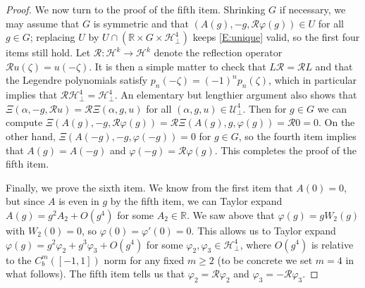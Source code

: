 \documentclass[11pt,reqno]{amsart}
\numberwithin{equation}{section}
\def\h{\mathcal{H}}
\def\R{\mathbb{R}}
\begin{document}
\begin{proof}
We now turn to the proof of the fifth item. Shrinking $G$ if necessary, we may assume that $G$ is symmetric and that $(A(g),-g,\mathcal{R}\varphi(g)) \in U$ for all $g \in G$; replacing $U$ by $U \cap (\R \times G \times \h^4_\bot)$ keeps \eqref{E:unique} valid, so the first four items still hold.  Let $\mathcal{R} : \h^k \to \h^k$ denote the reflection operator $\mathcal{R}u(\zeta) = u(-\zeta)$.  It is then a simple matter to check that $L \mathcal{R} = \mathcal{R} L$ and  that the Legendre polynomials satisfy $p_n(-\zeta) = (-1)^n p_n(\zeta)$, which in particular implies that $\mathcal{R}\h^4_\bot = \h^4_\bot$.  An elementary but lengthier argument also shows that $\Xi(\alpha, -g, \mathcal{R}u) = \mathcal{R}\Xi(\alpha, g, u)$ for all $(\alpha,g,u) \in \mathcal{U}^4_\bot$.  Then for $g \in G$ we can compute $\Xi(A(g), -g, \mathcal{R}\varphi(g)) = \mathcal{R} \Xi(A(g), g, \varphi(g)) = \mathcal{R}0=0$.  On  the other hand, $\Xi(A(-g),-g,\varphi(-g)) =0$ for $g \in G$,  so the fourth item implies that $A(g) = A(-g)$ and $\varphi(-g) = \mathcal{R} \varphi(g)$.  This completes the proof of the fifth item.

Finally, we prove the sixth item.  We know from the first item that $A(0) = 0$, but since $A$ is even in $g$ by the fifth item, we can Taylor expand $A(g) = g^2 A_2 + O(g^4)$ for some $A_2 \in \R$. We saw above that $\varphi(g) = g W_2(g)$ with $W_2(0) =0$, so $\varphi(0) = \varphi'(0) =0$.  This allows us to Taylor expand   $\varphi(g) = g^2 \varphi_2 + g^3 \varphi_3 + O(g^4)$ for some $\varphi_2,\varphi_3 \in \h^4_\bot$, where $O(g^4)$ is relative to the $C^m_b([-1,1])$ norm for any fixed $m \ge 2$ (to be concrete we set $m=4$ in what follows).  The fifth item tells us that $\varphi_2 = \mathcal{R} \varphi_2$ and $\varphi_3 = - \mathcal{R} \varphi_3$.  


\end{proof}
\end{document}
